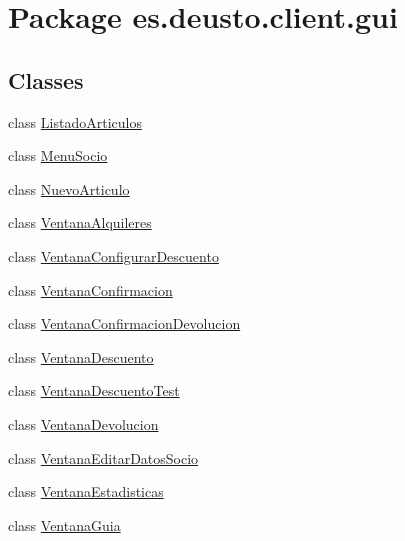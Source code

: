 \hypertarget{namespacees_1_1deusto_1_1client_1_1gui}{}\section{Package es.\+deusto.\+client.\+gui}
\label{namespacees_1_1deusto_1_1client_1_1gui}
\subsection*{Classes}
\begin{DoxyCompactItemize}
\item 
class \mbox{\hyperlink{classes_1_1deusto_1_1client_1_1gui_1_1_listado_articulos}{Listado\+Articulos}}
\item 
class \mbox{\hyperlink{classes_1_1deusto_1_1client_1_1gui_1_1_menu_socio}{Menu\+Socio}}
\item 
class \mbox{\hyperlink{classes_1_1deusto_1_1client_1_1gui_1_1_nuevo_articulo}{Nuevo\+Articulo}}
\item 
class \mbox{\hyperlink{classes_1_1deusto_1_1client_1_1gui_1_1_ventana_alquileres}{Ventana\+Alquileres}}
\item 
class \mbox{\hyperlink{classes_1_1deusto_1_1client_1_1gui_1_1_ventana_configurar_descuento}{Ventana\+Configurar\+Descuento}}
\item 
class \mbox{\hyperlink{classes_1_1deusto_1_1client_1_1gui_1_1_ventana_confirmacion}{Ventana\+Confirmacion}}
\item 
class \mbox{\hyperlink{classes_1_1deusto_1_1client_1_1gui_1_1_ventana_confirmacion_devolucion}{Ventana\+Confirmacion\+Devolucion}}
\item 
class \mbox{\hyperlink{classes_1_1deusto_1_1client_1_1gui_1_1_ventana_descuento}{Ventana\+Descuento}}
\item 
class \mbox{\hyperlink{classes_1_1deusto_1_1client_1_1gui_1_1_ventana_descuento_test}{Ventana\+Descuento\+Test}}
\item 
class \mbox{\hyperlink{classes_1_1deusto_1_1client_1_1gui_1_1_ventana_devolucion}{Ventana\+Devolucion}}
\item 
class \mbox{\hyperlink{classes_1_1deusto_1_1client_1_1gui_1_1_ventana_editar_datos_socio}{Ventana\+Editar\+Datos\+Socio}}
\item 
class \mbox{\hyperlink{classes_1_1deusto_1_1client_1_1gui_1_1_ventana_estadisticas}{Ventana\+Estadisticas}}
\item 
class \mbox{\hyperlink{classes_1_1deusto_1_1client_1_1gui_1_1_ventana_guia}{Ventana\+Guia}}

\end{DoxyCompactItemize}
